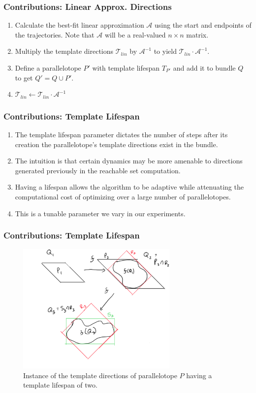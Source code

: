 \documentclass{beamer}
\newcommand{\T}{\mathcal{T}}
\begin{document}
\begin{frame}
    \frametitle{\textbf{Contributions:} Linear Approx. Directions}
    \begin{enumerate}
      \item Calculate the best-fit linear approximation $\mathcal{A}$ using the start and endpoints of the trajectories. Note that $\mathcal{A}$ will be a real-valued $n \times n$ matrix.
      \item Multiply the template directions $\T_{lin}$ by $\mathcal{A}^{-1}$ to yield $\T_{lin} \cdot \mathcal{A}^{-1}$.
      \item Define a parallelotope $P'$ with template lifespan $T_{P'}$ and add it to bundle $Q$ to get $Q' = Q \cup P'$.
      \item $\T_{lin} \gets \T_{lin} \cdot \mathcal{A}^{-1}$
    \end{enumerate}
\end{frame}

\begin{frame}
    \frametitle{\textbf{Contributions:} Template Lifespan}
    \begin{enumerate}
      \item The template lifespan parameter dictates the number of steps after its creation the parallelotope's template directions exist in the bundle.
      \item The intuition is that certain dynamics may be more amenable to directions generated previously in the reachable set computation.
      \item Having a lifespan allows the algorithm to be adaptive while attenuating the computational cost of optimizing over a large number of parallelotopes.
      \item This is a tunable parameter we vary in our experiments.
    \end{enumerate}
\end{frame}

\begin{frame}
    \frametitle{\textbf{Contributions:} Template Lifespan}
    \begin{figure}
      \includegraphics[width=0.7\textwidth]{templifespan}
      \caption{Instance of the template directions of parallelotope $P$ having a template lifespan of two.}
    \end{figure}
\end{frame}
\end{document}
